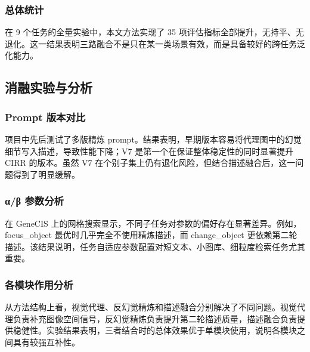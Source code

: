 \documentclass[12pt,a4paper,UTF8,oneside,openany]{ctexrep}
\begin{document}
\hypertarget{ux603bux4f53ux7edfux8ba1}{%
\subsubsection{总体统计}\label{ux603bux4f53ux7edfux8ba1}}

在 9 个任务的全量实验中，本文方法实现了 35
项评估指标全部提升，无持平、无退化。这一结果表明三路融合不是只在某一类场景有效，而是具备较好的跨任务泛化能力。

\hypertarget{ux6d88ux878dux5b9eux9a8cux4e0eux5206ux6790}{%
\subsection{消融实验与分析}\label{ux6d88ux878dux5b9eux9a8cux4e0eux5206ux6790}}

\hypertarget{prompt-ux7248ux672cux5bf9ux6bd4}{%
\subsubsection{Prompt 版本对比}\label{prompt-ux7248ux672cux5bf9ux6bd4}}

项目中先后测试了多版精炼
prompt。结果表明，早期版本容易将代理图中的幻觉细节写入描述，导致性能下降；V7
是第一个在保证整体稳定性的同时显著提升 CIRR 的版本。虽然 V7
在个别子集上仍有退化风险，但结合描述融合后，这一问题得到了明显缓解。

\hypertarget{ux3b1ux3b2-ux53c2ux6570ux5206ux6790}{%
\subsubsection{α/β 参数分析}\label{ux3b1ux3b2-ux53c2ux6570ux5206ux6790}}

在 GeneCIS
上的网格搜索显示，不同子任务对参数的偏好存在显著差异。例如，focus\_object
最优时几乎完全不使用精炼描述，而 change\_object
更依赖第二轮描述。该结果说明，任务自适应参数配置对短文本、小图库、细粒度检索任务尤其重要。

\hypertarget{ux5404ux6a21ux5757ux4f5cux7528ux5206ux6790}{%
\subsubsection{各模块作用分析}\label{ux5404ux6a21ux5757ux4f5cux7528ux5206ux6790}}

从方法结构上看，视觉代理、反幻觉精炼和描述融合分别解决了不同问题。视觉代理负责补充图像空间信号，反幻觉精炼负责提升第二轮描述质量，描述融合负责提供稳健性。实验结果表明，三者结合时的总体效果优于单模块使用，说明各模块之间具有较强互补性。
\end{document}
